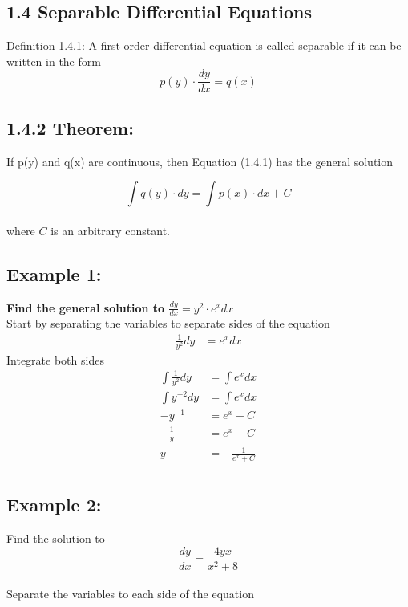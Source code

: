 \documentclass{article}
\begin{document}
\begin{flushleft}
\section*{1.4 Separable Differential Equations  } {
Definition 1.4.1:
A first-order differential equation is called separable if it can be written in the form
\[p(y)\cdot \frac{dy}{dx} = q(x) \] 


\subsection*{\textbf{1.4.2 Theorem:}} 
If p(y) and q(x) are continuous, then Equation (1.4.1) has the general solution

\[\int q(y) \cdot dy  = \int p(x) \cdot dx + C\]\\


where $C$ is an arbitrary constant.\\
\bigskip
\subsection*{\textbf{Example 1:}} 
\textbf{Find the general solution to $\frac{dy}{dx} = y^2 \cdot e^x dx$}\\

Start by separating the variables to separate sides of the equation\\
\begin{align*}
\frac{1}{y^2} dy & = e^x dx
\end{align*}
Integrate both sides
\begin{align*}
\int \frac{1}{y^2} dy & = \int e^x dx \\
\int y^{-2} dy & = \int e^x dx \\
-y^{-1} & = e^x + C \\
-\frac{1}{y} & = e^x +C \\
y & = - \frac{1}{e^x + C} \\
\end{align*}

\subsection*{\textbf{Example 2:}} 
Find the solution to \[\frac{dy}{dx}=\frac{4yx}{x^2+8}\] \\ 
Separate the variables to each side of the equation \\

}
\end{flushleft}
\end{document}
